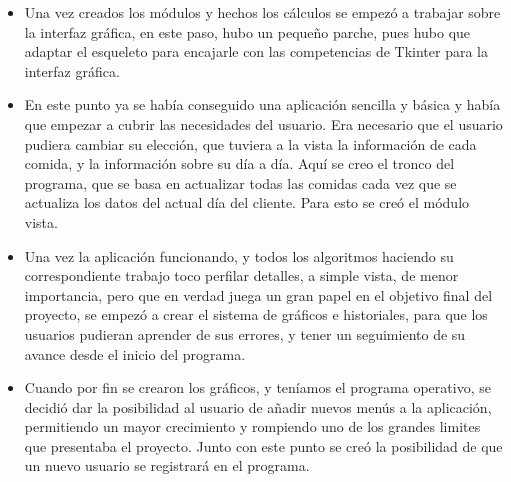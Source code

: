 \begin{itemize}
\item	Una vez creados los módulos y hechos los cálculos se empezó a trabajar sobre la interfaz gráfica, en este paso, hubo un pequeño parche, pues hubo que adaptar el esqueleto para encajarle con las competencias de Tkinter para la interfaz gráfica.
\item	En este punto ya se había conseguido una aplicación sencilla y básica y había que empezar a cubrir las necesidades del usuario. Era necesario que el usuario pudiera cambiar su elección, que tuviera a la vista la información de cada comida, y la información sobre su día a día. Aquí se creo el tronco del programa, que se basa en actualizar todas las comidas cada vez que se actualiza los datos del actual día del cliente. Para esto se creó el módulo vista.
\item	Una vez la aplicación funcionando, y todos los algoritmos haciendo su correspondiente trabajo toco perfilar detalles, a simple vista, de menor importancia, pero que en verdad juega un gran papel en el objetivo final del proyecto, se empezó a crear el sistema de gráficos e historiales, para que los usuarios pudieran aprender de sus errores, y tener un seguimiento de su avance desde el inicio del programa.
\item Cuando por fin se crearon los gráficos, y teníamos el programa operativo, se decidió dar la posibilidad al usuario de añadir nuevos menús a la aplicación, permitiendo un mayor crecimiento y rompiendo uno de los grandes limites que presentaba el proyecto. Junto con este punto se creó la posibilidad de que un nuevo usuario se registrará en el programa.

\end{itemize}
